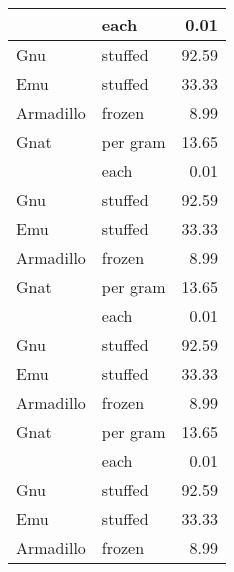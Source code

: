 {\begin{longtable}[l]{llr}
\hline
\rowcolor{latextbl!25}          & each     & 0.01  \\
\hline
\rowcolor{latextbl!10}Gnu       & stuffed  & 92.59 \\
\hline
\rowcolor{latextbl!25}Emu       & stuffed  & 33.33 \\
\hline
\rowcolor{latextbl!10}Armadillo & frozen   & 8.99  \\
\hline
\rowcolor{latextbl!25}Gnat      & per gram & 13.65 \\
\hline
\rowcolor{latextbl!10}          & each     & 0.01  \\
\hline
\rowcolor{latextbl!25}Gnu       & stuffed  & 92.59 \\
\hline
\rowcolor{latextbl!10}Emu       & stuffed  & 33.33 \\
\hline
\rowcolor{latextbl!25}Armadillo & frozen   & 8.99  \\
\hline
\rowcolor{latextbl!10}Gnat      & per gram & 13.65 \\
\hline
\rowcolor{latextbl!25}          & each     & 0.01  \\
\hline
\rowcolor{latextbl!10}Gnu       & stuffed  & 92.59 \\
\hline
\rowcolor{latextbl!25}Emu       & stuffed  & 33.33 \\
\hline
\rowcolor{latextbl!10}Armadillo & frozen   & 8.99  \\
\hline
\rowcolor{latextbl!25}Gnat      & per gram & 13.65 \\
\hline
\rowcolor{latextbl!10}          & each     & 0.01  \\
\hline
\rowcolor{latextbl!25}Gnu       & stuffed  & 92.59 \\
\hline
\rowcolor{latextbl!10}Emu       & stuffed  & 33.33 \\
\hline
\rowcolor{latextbl!25}Armadillo & frozen   & 8.99  \\
\end{longtable}
}

